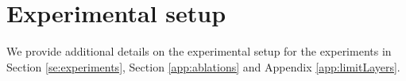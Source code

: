 \documentclass{article}
\theoremstyle{plain}
\theoremstyle{definition}
\theoremstyle{definition}
\theoremstyle{remark}
\theoremstyle{definition}
\theoremstyle{definition}
\theoremstyle{remark}
\numberwithin{equation}{section}
\begin{document}


\section{Experimental setup}\label{app:experiments}
We provide additional details on the experimental setup for the experiments in Section \ref{se:experiments}, Section \ref{app:ablations} and Appendix \ref{app:limitLayers}. 
\end{document}
